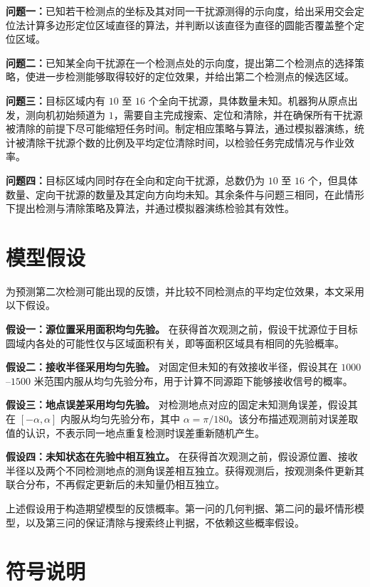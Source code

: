 \documentclass[UTF8,a4paper,zihao=-4,fontset=none]{ctexart}
\begin{document}
\textbf{问题一：}已知若干检测点的坐标及其对同一干扰源测得的示向度，给出采用交会定位法计算多边形定位区域直径的算法，并判断以该直径为直径的圆能否覆盖整个定位区域。

\textbf{问题二：}已知某全向干扰源在一个检测点处的示向度，提出第二个检测点的选择策略，使进一步检测能够取得较好的定位效果，并给出第二个检测点的候选区域。

\textbf{问题三：}目标区域内有 \(10\) 至 \(16\) 个全向干扰源，具体数量未知。机器狗从原点出发，测向机初始频道为 \(1\)，需要自主完成搜索、定位和清除，并在确保所有干扰源被清除的前提下尽可能缩短任务时间。制定相应策略与算法，通过模拟器演练，统计被清除干扰源个数的比例及平均定位清除时间，以检验任务完成情况与作业效率。

\textbf{问题四：}目标区域内同时存在全向和定向干扰源，总数仍为 \(10\) 至 \(16\) 个，但具体数量、定向干扰源的数量及其定向方向均未知。其余条件与问题三相同，在此情形下提出检测与清除策略及算法，并通过模拟器演练检验其有效性。


\section{模型假设}

为预测第二次检测可能出现的反馈，并比较不同检测点的平均定位效果，本文采用以下假设。

\textbf{假设一：源位置采用面积均匀先验。} 在获得首次观测之前，假设干扰源位于目标圆域内各处的可能性仅与区域面积有关，即等面积区域具有相同的先验概率。

\textbf{假设二：接收半径采用均匀先验。} 对固定但未知的有效接收半径，假设其在 \(1000\)--\(1500\) 米范围内服从均匀先验分布，用于计算不同源距下能够接收信号的概率。

\textbf{假设三：地点误差采用均匀先验。} 对检测地点对应的固定未知测角误差，假设其在 \([-\alpha,\alpha]\) 内服从均匀先验分布，其中 \(\alpha=\pi/180\)。该分布描述观测前对误差取值的认识，不表示同一地点重复检测时误差重新随机产生。

\textbf{假设四：未知状态在先验中相互独立。} 在获得首次观测之前，假设源位置、接收半径以及两个不同检测地点的测角误差相互独立。获得观测后，按观测条件更新其联合分布，不再假定更新后的未知量仍相互独立。

上述假设用于构造期望模型的反馈概率。第一问的几何判据、第二问的最坏情形模型，以及第三问的保证清除与搜索终止判据，不依赖这些概率假设。

\section{符号说明}
\end{document}
